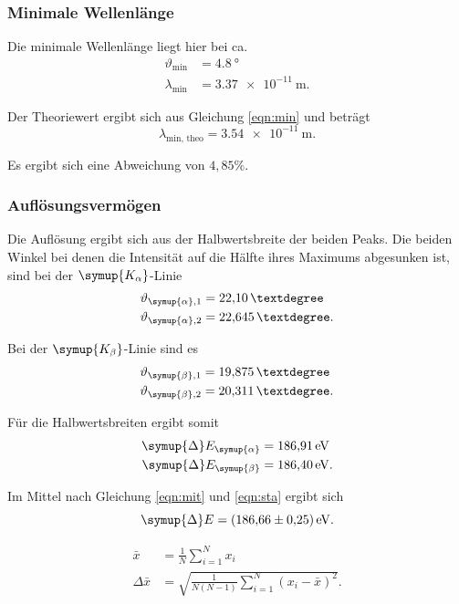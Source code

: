 \subsubsection{Minimale Wellenlänge}

Die minimale Wellenlänge liegt hier bei ca.
\begin{align*}
  \vartheta_\text{min} &= \SI{4,8}{°} \\
  \lambda_\text{min} &= \SI{3,37e-11}{\m}.
\end{align*}

Der Theoriewert ergibt sich aus Gleichung \ref{eqn:min} und beträgt
\begin{equation*}
  \lambda_\text{min, theo} = \SI{3,54e-11}{\m}.
\end{equation*}

Es ergibt sich eine Abweichung von $4,85 \%$.

\subsubsection{Auflösungsvermögen}

Die Auflösung ergibt sich aus der Halbwertsbreite der beiden Peaks. Die beiden Winkel bei denen die Intensität auf die Hälfte
ihres Maximums abgesunken ist, sind bei der $\symup{K_\alpha}$-Linie
\begin{align*}
  \vartheta_{\symup{\alpha}, 1} &= \SI{22,10}{°} \\
  \vartheta_{\symup{\alpha}, 2} &= \SI{22,645}{°}.
\end{align*}

Bei der $\symup{K_\beta}$-Linie sind es
\begin{align*}
  \vartheta_{\symup{\beta}, 1} &= \SI{19,875}{°} \\
  \vartheta_{\symup{\beta}, 2} &= \SI{20,311}{°}.
\end{align*}

Für die Halbwertsbreiten ergibt somit
\begin{align*}
  \symup{\Delta} E_{\symup{\alpha}} &= \SI{186,91}{\eV} \\
  \symup{\Delta} E_{\symup{\beta}} &= \SI{186,40}{\eV}.
\end{align*}

Im Mittel nach Gleichung \eqref{eqn:mit} und \eqref{eqn:sta} ergibt sich
\begin{equation*}
  \symup{\Delta} E = \SI{186,66(25)}{\eV}.
\end{equation*}

\begin{align}
  \bar{x} &= \frac{1}{N} \sum_{i=1}^{N} x_i
  \label{eqn:mit} \\
  \Delta \bar{x} &= \sqrt{\frac{1}{N (N - 1)} \sum_{i=1}^{N} (x_i - \bar{x})^2}.
  \label{eqn:sta}
\end{align}

